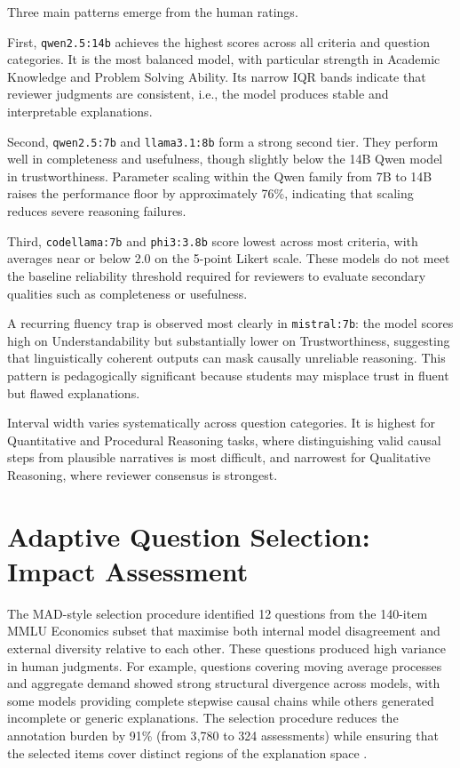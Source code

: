 Three main patterns emerge from the human ratings.

First, \texttt{qwen2.5:14b} achieves the highest scores across all criteria and
question categories. It is the most balanced model, with particular strength in
Academic Knowledge and Problem Solving Ability. Its narrow IQR bands indicate that
reviewer judgments are consistent, i.e., the model produces stable and interpretable
explanations.

Second, \texttt{qwen2.5:7b} and \texttt{llama3.1:8b} form a strong second tier.
They perform well in completeness and usefulness, though slightly below the 14B
Qwen model in trustworthiness. Parameter scaling within the Qwen family from 7B to
14B raises the performance floor by approximately 76\%, indicating that scaling
reduces severe reasoning failures.

Third, \texttt{codellama:7b} and \texttt{phi3:3.8b} score lowest across most
criteria, with averages near or below 2.0 on the 5-point Likert scale. These models
do not meet the baseline reliability threshold required for reviewers to evaluate
secondary qualities such as completeness or usefulness.

A recurring fluency trap is observed most clearly in \texttt{mistral:7b}: the model
scores high on Understandability but substantially lower on Trustworthiness,
suggesting that linguistically coherent outputs can mask causally unreliable
reasoning. This pattern is pedagogically significant because students may misplace
trust in fluent but flawed explanations.

Interval width varies systematically across question categories. It is highest for
Quantitative and Procedural Reasoning tasks, where distinguishing valid causal steps
from plausible narratives is most difficult, and narrowest for Qualitative Reasoning,
where reviewer consensus is strongest.

\section{Adaptive Question Selection: Impact Assessment}
\label{sec:res-qselect}

The MAD-style selection procedure identified 12 questions from the 140-item MMLU
Economics subset that maximise both internal model disagreement and external
diversity relative to each other. These questions produced high variance in human
judgments. For example, questions covering moving average processes and aggregate
demand showed strong structural divergence across models, with some models providing
complete stepwise causal chains while others generated incomplete or generic
explanations. The selection procedure reduces the annotation burden by 91\%
(from 3{,}780 to 324 assessments) while ensuring that the selected items cover
distinct regions of the explanation space \citep{feng2025sample}.
